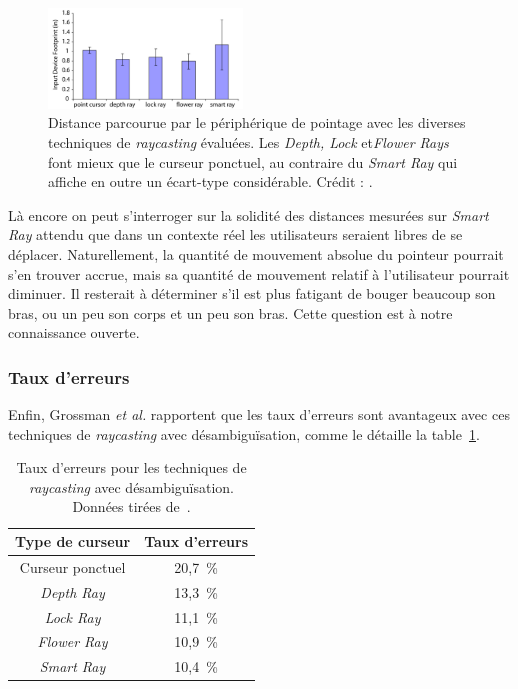 	\begin{figure} %
		\centering
		\includegraphics[width=0.46\textwidth]{figures/ch2/rayFootprint}
		\caption[\emph{Raycasting} et désambiguïsation -- distance parcourue par le périphérique]{Distance parcourue par le périphérique de pointage avec les diverses techniques de \emph{raycasting} évaluées. Les \emph{Depth, Lock} et\emph{Flower Rays} font mieux que le curseur ponctuel, au contraire du \emph{Smart Ray} qui affiche en outre un écart-type considérable. Crédit : \cite{grossman2006design}.}
		\label{fig:rayFootprint}
	\end{figure}
	
	Là encore on peut s'interroger sur la solidité des distances mesurées sur \emph{Smart Ray} attendu que dans un contexte \og réel \fg{} les utilisateurs seraient libres de se déplacer. Naturellement, la quantité de mouvement absolue du pointeur pourrait s'en trouver accrue, mais sa quantité de mouvement relatif à l'utilisateur pourrait diminuer. Il resterait à déterminer s'il est plus fatigant de bouger beaucoup son bras, ou un peu son corps et un peu son bras. Cette question est à notre connaissance ouverte.
	
	\subsubsection{Taux d'erreurs}
	Enfin, Grossman \emph{et al.} rapportent que les taux d'erreurs sont avantageux avec ces techniques de \emph{raycasting} avec désambiguïsation, comme le détaille la table~\ref{tab:rayErrors}.
	
	\begin{table}
	\centering
	\begin{tabular}{c c}
		Type de curseur			& Taux d'erreurs \bigstrut[b] \\ \hline
		Curseur ponctuel		& 20,7~\%{} \bigstrut[t] \\
		\emph{Depth Ray}		& 13,3~\%{} \\
		\emph{Lock Ray}			& 11,1~\%{} \\
		\emph{Flower Ray}		& 10,9~\%{} \\
		\emph{Smart Ray}		& 10,4~\%{} \\
	\end{tabular}
	\caption[Taux d'erreurs pour les techniques de \emph{raycasting} avec désambiguïsation]{Taux d'erreurs pour les techniques de \emph{raycasting} avec désambiguïsation. Données tirées de~\cite{grossman2006design}.}
	\label{tab:rayErrors}
	\end{table}
	
